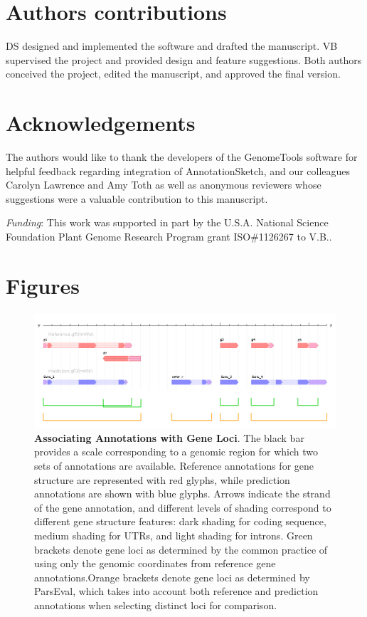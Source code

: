 \section{Authors contributions}
DS designed and implemented the software and drafted the manuscript.
VB supervised the project and provided design and feature suggestions.
Both authors conceived the project, edited the manuscript, and approved the final version.


\section{Acknowledgements}
The authors would like to thank the developers of the GenomeTools software for helpful feedback regarding integration of AnnotationSketch, and our colleagues Carolyn Lawrence and Amy Toth as well as anonymous reviewers whose suggestions were a valuable contribution to this manuscript.

\emph{Funding}: This work was supported in part by the U.S.A. National Science Foundation Plant Genome Research Program grant ISO\#1126267 to V.B..

\newpage

\section{Figures}

\begin{figure}[h]
\includegraphics[width=6in]{Assets/Graphics/ParsEval/figure-1.png}
\caption{\textbf{Associating Annotations with Gene Loci}.
The black bar provides a scale corresponding to a genomic region for which two sets of
annotations are available. Reference annotations for gene structure are represented with red glyphs, while prediction annotations are shown with
blue glyphs. Arrows indicate the strand of the gene annotation, and different levels of shading correspond to different gene structure features: dark
shading for coding sequence, medium shading for UTRs, and light shading for introns. Green brackets denote gene loci as determined by the
common practice of using only the genomic coordinates from reference gene annotations.Orange brackets denote gene loci as determined by
ParsEval, which takes into account both reference and prediction annotations when selecting distinct loci for comparison.}
\label{Fig:ParsEval1}
\end{figure}

